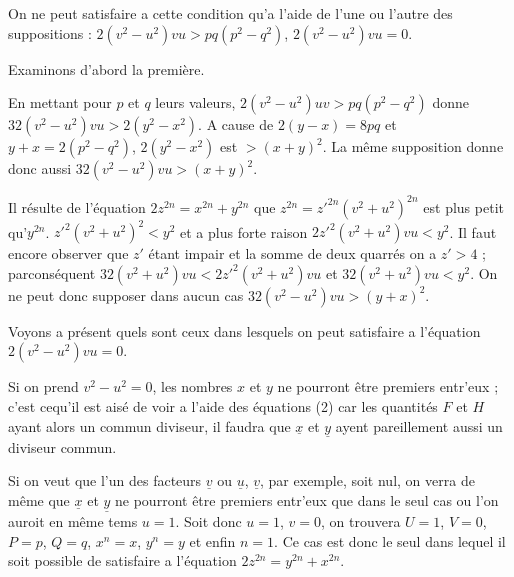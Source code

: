 \documentclass[11pt,a4paper]{article}
\begin{document}
On ne peut satisfaire a cette condition qu'a l'aide de l'une ou l'autre
des suppositions : $2(v^2-u^2)vu>pq(p^2-q^2)$, $2(v^2-u^2)vu=0$.

Examinons d'abord la première.

En mettant pour $p$ et $q$ leurs valeurs, $2(v^2-u^2)uv>pq(p^2-q^2)$ donne
$32(v^2-u^2)vu>2(y^2-x^2)$. A cause de $2(y-x)=8pq$ et $y+x=2(p^2-q^2)$, $2(y^2-x^2)$ est $>(x+y)^2$.
La même supposition donne donc aussi $32(v^2-u^2)vu>(x+y)^2$.

Il résulte de l'équation $2z^{2n}=x^{2n}+y^{2n}$ que $z^{2n}=z'^{2n}(v^2+u^2)^{2n}$ est
plus petit qu'$y^{2n}$. $z'^2(v^2+u^2)^2<y^2$ et a plus forte raison $2z'^2(v^2+u^2)vu<y^2$.
Il faut encore observer que $z'$ étant impair et la somme de deux
quarrés on a $z'>4$ ; parconséquent $32(v^2+u^2)vu<2z'^2(v^2+u^2)vu$ et
$32(v^2+u^2)vu<y^2$. On ne peut donc supposer dans aucun cas
$32(v^2-u^2)vu>(y+x)^2$.

Voyons a présent quels sont ceux dans lesquels on peut
satisfaire a l'équation $2(v^2-u^2)vu=0$.

Si on prend $v^2-u^2=0$, les nombres $x$ et $y$ ne pourront être
premiers entr'eux ; c'est cequ'il est aisé de voir a l'aide des
équations (2) car les quantités $F$ et $H$ ayant alors un
commun diviseur, il faudra que $\underline{x}$ et $\underline{y}$ ayent pareillement
aussi un diviseur commun.

Si on veut que l'un des facteurs $\underline{v}$ ou $\underline{u}$, $\underline{v}$, par exemple,
soit nul, on verra de même que $\underline{x}$ et $\underline{y}$ ne pourront être
premiers entr'eux que dans le seul cas ou l'on auroit
en même tems $u=1$. Soit donc $u=1$, $v=0$, on trouvera
$U=1$, $V=0$, $P=p$, $Q=q$, $x^n=x$, $y^n=y$ et enfin $n=1$. Ce cas
est donc le seul dans lequel il soit possible de
satisfaire a l'équation $2z^{2n}=y^{2n}+x^{2n}$.


\end{document}
